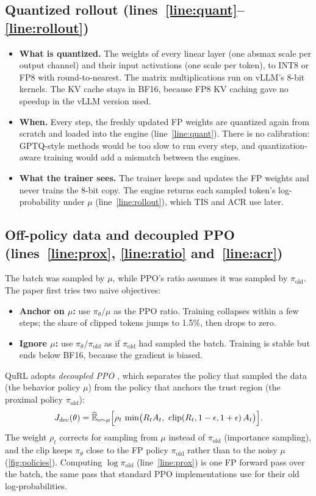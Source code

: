 \documentclass[11pt]{article}
\newcommand{\pold}{\pi_{\mathrm{old}}}
\newcommand{\Ehat}{\widehat{\mathbb E}}
\begin{document}
\subsection{Quantized rollout (lines~\ref{line:quant}--\ref{line:rollout})}\label{sec:rollout}
\begin{itemize}
\item \textbf{What is quantized.} The weights of every linear layer (one absmax scale per output channel) and their input activations (one scale per token), to INT8 or FP8 with round-to-nearest. The matrix multiplications run on vLLM's 8-bit kernels. The KV cache stays in BF16, because FP8 KV caching gave no speedup in the vLLM version used.
\item \textbf{When.} Every step, the freshly updated FP weights are quantized again from scratch and loaded into the engine (line~\ref{line:quant}). There is no calibration: GPTQ-style methods would be too slow to run every step, and quantization-aware training would add a mismatch between the engines.
\item \textbf{What the trainer sees.} The trainer keeps and updates the FP weights and never trains the 8-bit copy. The engine returns each sampled token's log-probability under $\mu$ (line~\ref{line:rollout}), which TIS and ACR use later.
\end{itemize}

\subsection{Off-policy data and decoupled PPO (lines~\ref{line:prox}, \ref{line:ratio} and~\ref{line:acr})}\label{sec:decoupled}
The batch was sampled by $\mu$, while PPO's ratio assumes it was sampled by $\pold$. The paper first tries two naive objectives:
\begin{itemize}
\item \textbf{Anchor on $\mu$:} use $\pi_\theta/\mu$ as the PPO ratio. Training collapses within a few steps; the share of clipped tokens jumps to 1.5\%, then drops to zero.
\item \textbf{Ignore $\mu$:} use $\pi_\theta/\pold$ as if $\pold$ had sampled the batch. Training is stable but ends below BF16, because the gradient is biased.
\end{itemize}
QuRL adopts \emph{decoupled PPO} \citep{hilton2022batch,fu2025areal}, which separates the policy that sampled the data (the behavior policy $\mu$) from the policy that anchors the trust region (the proximal policy $\pold$):
\begin{equation}\label{eq:decoupled}
J_{\mathrm{dec}}(\theta)=\Ehat_{o\sim\mu}\Bigl[\rho_t\,\min\bigl(R_tA_t,\ \clip(R_t,1-\epsilon,1+\epsilon)\,A_t\bigr)\Bigr].
\end{equation}
The weight $\rho_t$ corrects for sampling from $\mu$ instead of $\pold$ (importance sampling), and the clip keeps $\pi_\theta$ close to the FP policy $\pold$ rather than to the noisy $\mu$ (\cref{fig:policies}). Computing $\log\pold$ (line~\ref{line:prox}) is one FP forward pass over the batch, the same pass that standard PPO implementations use for their old log-probabilities.
\end{document}
